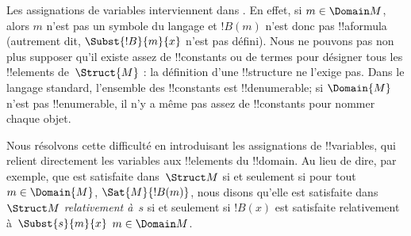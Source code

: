 \documentclass[../../../include/open-logic-section]{subfiles}
\begin{document}
\begin{explain}
Les assignations de variables interviennent dans
.
 En effet, si
$m \in \Domain M$, alors $m$ n'est pas un symbole du langage et
$!B(m)$ n'est donc pas !!a{formula} (autrement dit,
$\Subst{!B}{m}{x}$ n'est pas défini). Nous ne pouvons pas non plus
supposer qu'il existe assez de !!{constant}s ou de termes pour
désigner tous les !!{element}s de~$\Struct{M}$ : la définition d'une
!!{structure} ne l'exige pas. Dans le langage standard, l'ensemble
des !!{constant}s est !!{denumerable}; si $\Domain{M}$ n'est pas
!!{enumerable}, il n'y a même pas assez de !!{constant}s pour nommer
chaque objet.

Nous résolvons cette difficulté en introduisant les assignations de
!!{variable}s, qui relient directement les variables aux !!{element}s
du !!{domain}. Au lieu de dire, par exemple, que
 est satisfaite
dans~$\Struct M$ si et seulement si
{pour tout $m \in \Domain{M}$, $\Sat{M}{!B(m)}$}, nous disons qu'elle
est satisfaite dans~$\Struct M$ \emph{relativement à}~$s$ si et
seulement si $!B(x)$ est satisfaite relativement
à~$\Subst{s}{m}{x}$ 
$m \in \Domain M$.
\end{explain}
\end{document}

